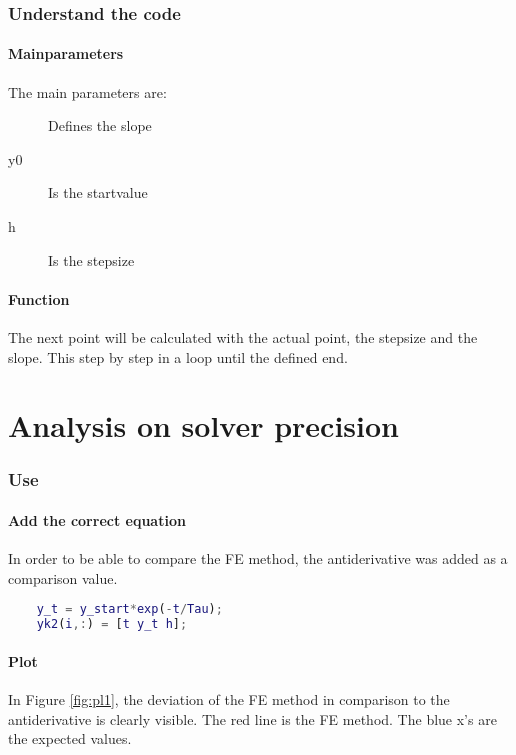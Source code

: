 		
	\section{Understand the code}
		\subsection{Mainparameters}
	
			The main parameters are:  
			\begin{description}
				\item[\boldmath{$\tau$}] 	Defines the slope
				\item[y0] 		Is the startvalue
				\item[h] 		Is the stepsize
			\end{description}
		
		\subsection{Function}
			 The next point will be calculated with the actual point, the stepsize and the slope. This step by step in a loop until the defined end.
			


\newpage
\part{Analysis on solver precision}
	\section{Use }
		\subsection{Add the correct equation}
		In order to be able to compare the FE method, the antiderivative was added as a comparison value.
		
		
\begin{lstlisting}[caption={The antiderivative}, language=matlab, backgroundcolor = \color{lgray}, firstnumber=23]
	%4a
	y_t = y_start*exp(-t/Tau);
	yk2(i,:) = [t y_t h]; 
\end{lstlisting}				
		
		
		\subsection{Plot}
		In Figure \ref{fig:pl1}, the deviation of the FE method in comparison to the antiderivative is clearly visible. The red line is the FE method. The blue x's are the expected values.
		
